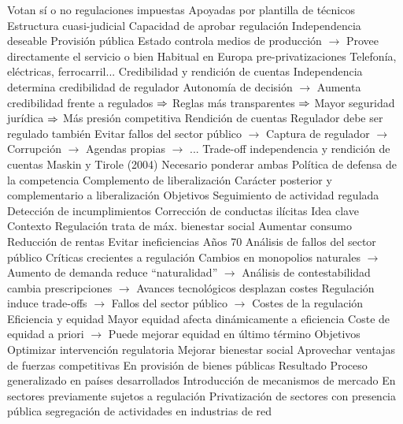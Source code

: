 \documentclass{nuevotema}
\begin{document}
\begin{esquemal}
				\4[] Votan sí o no regulaciones impuestas
				\4[] Apoyadas por plantilla de técnicos
				\4 Estructura cuasi-judicial
				\4 Capacidad de aprobar regulación
				\4 Independencia deseable
			\3 Provisión pública
				\4 Estado controla medios de producción
				\4[] $\to$ Provee directamente el servicio o bien
				\4 Habitual en Europa pre-privatizaciones
				\4[] Telefonía, eléctricas, ferrocarril...
			\3 Credibilidad y rendición de cuentas
				\4 Independencia determina credibilidad de regulador
				\4[] Autonomía de decisión
				\4[] $\to$ Aumenta credibilidad frente a regulados
				\4[] $\Rightarrow$ Reglas más transparentes
				\4[] $\Rightarrow$ Mayor seguridad jurídica
				\4[] $\Rightarrow$ Más presión competitiva
				\4 Rendición de cuentas
				\4[] Regulador debe ser regulado también
				\4[] Evitar fallos del sector público
				\4[] $\to$ Captura de regulador
				\4[] $\to$ Corrupción
				\4[] $\to$ Agendas propias
				\4[] $\to$ ...
				\4 Trade-off independencia y rendición de cuentas
				\4[] Maskin y Tirole (2004)
				\4[] Necesario ponderar ambas
			\3 Política de defensa de la competencia
				\4 Complemento de liberalización
				\4 Carácter posterior y complementario a liberalización
				\4 Objetivos
				\4[] Seguimiento de actividad regulada
				\4[] Detección de incumplimientos
				\4[] Corrección de conductas ilícitas
	\1 
		\2 Idea clave
			\3 Contexto
				\4 Regulación trata de máx. bienestar social
				\4[] Aumentar consumo
				\4[] Reducción de rentas
				\4[] Evitar ineficiencias
				\4 Años 70
				\4[] Análisis de fallos del sector público
				\4[] Críticas crecientes a regulación
				\4[] Cambios en monopolios naturales
				\4[] $\to$ Aumento de demanda reduce ``naturalidad''
				\4[] $\to$ Análisis de contestabilidad cambia prescripciones
				\4[] $\to$ Avances tecnológicos desplazan costes
				\4 Regulación induce trade-offs
				\4[] $\to$ Fallos del sector público
				\4[] $\to$ Costes de la regulación
				\4 Eficiencia y equidad
				\4[] Mayor equidad afecta dinámicamente a eficiencia
				\4[] Coste de equidad a priori
				\4[] $\to$ Puede mejorar equidad en último término
			\3 Objetivos
				\4 Optimizar intervención regulatoria
				\4 Mejorar bienestar social
				\4 Aprovechar ventajas de fuerzas competitivas
				\4[] En provisión de bienes públicas
			\3 Resultado
				\4 Proceso generalizado en países desarrollados
				\4 Introducción de mecanismos de mercado
				\4[] En sectores previamente sujetos a regulación
				\4 Privatización de sectores con presencia pública
				\4 segregación de actividades en industrias de red

\end{esquemal}
\end{document}
